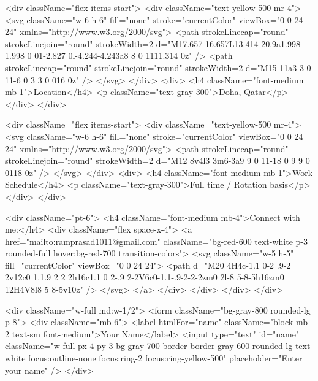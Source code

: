 {                <div className="flex items-start">
                  <div className="text-yellow-500 mr-4">
                    <svg className="w-6 h-6" fill="none" stroke="currentColor" viewBox="0 0 24 24" xmlns="http://www.w3.org/2000/svg">
                      <path strokeLinecap="round" strokeLinejoin="round" strokeWidth={2} d="M17.657 16.657L13.414 20.9a1.998 1.998 0 01-2.827 0l-4.244-4.243a8 8 0 1111.314 0z" />
                      <path strokeLinecap="round" strokeLinejoin="round" strokeWidth={2} d="M15 11a3 3 0 11-6 0 3 3 0 016 0z" />
                    </svg>
                  </div>
                  <div>
                    <h4 className="font-medium mb-1">Location</h4>
                    <p className="text-gray-300">Doha, Qatar</p>
                  </div>
                </div>
                
                <div className="flex items-start">
                  <div className="text-yellow-500 mr-4">
                    <svg className="w-6 h-6" fill="none" stroke="currentColor" viewBox="0 0 24 24" xmlns="http://www.w3.org/2000/svg">
                      <path strokeLinecap="round" strokeLinejoin="round" strokeWidth={2} d="M12 8v4l3 3m6-3a9 9 0 11-18 0 9 9 0 0118 0z" />
                    </svg>
                  </div>
                  <div>
                    <h4 className="font-medium mb-1">Work Schedule</h4>
                    <p className="text-gray-300">Full time / Rotation basis</p>
                  </div>
                </div>
                
                <div className="pt-6">
                  <h4 className="font-medium mb-4">Connect with me:</h4>
                  <div className="flex space-x-4">
                    <a href="mailto:ramprasad1011@gmail.com" className="bg-red-600 text-white p-3 rounded-full hover:bg-red-700 transition-colors">
                      <svg className="w-5 h-5" fill="currentColor" viewBox="0 0 24 24">
                        <path d="M20 4H4c-1.1 0-2 .9-2 2v12c0 1.1.9 2 2 2h16c1.1 0 2-.9 2-2V6c0-1.1-.9-2-2-2zm0 2l-8 5-8-5h16zm0 12H4V8l8 5 8-5v10z" />
                      </svg>
                    </a>
                  </div>
                </div>
              </div>
            </div>
            
            <div className="w-full md:w-1/2">
              <form className="bg-gray-800 rounded-lg p-8">
                <div className="mb-6">
                  <label htmlFor="name" className="block mb-2 text-sm font-medium">Your Name</label>
                  <input
                    type="text"
                    id="name"
                    className="w-full px-4 py-3 bg-gray-700 border border-gray-600 rounded-lg text-white focus:outline-none focus:ring-2 focus:ring-yellow-500"
                    placeholder="Enter your name"
                  />
                </div>
                
}
